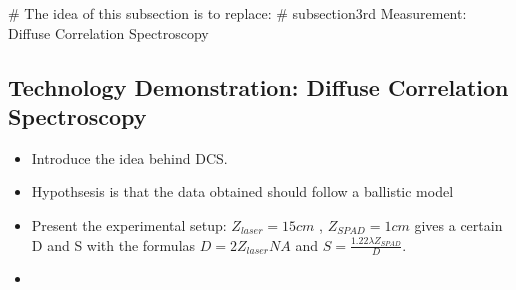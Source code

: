 # The idea of this subsection is to replace: 
# subsection{3rd Measurement: Diffuse Correlation Spectroscopy}
\subsection{Technology Demonstration: Diffuse Correlation Spectroscopy}
\begin{itemize}
    \item Introduce the idea behind DCS. 
    \item Hypothsesis is that the data obtained should follow a ballistic model
    \item Present the experimental setup: $Z_{laser} = 15 cm$ , $Z_{SPAD} = 1 cm$ 
    gives a certain D and S with the formulas $D=2Z_{laser}NA$ and $S=\frac{1.22 \lambda Z_{SPAD}}{D}$.
    \item 
\end{itemize}